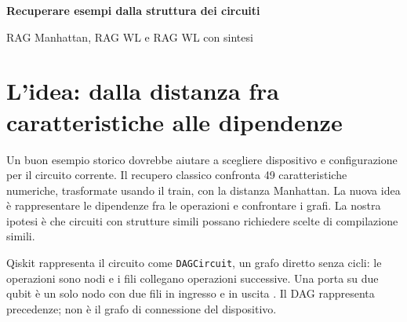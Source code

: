 \documentclass[a4paper,10pt]{article}
\begin{document}
{\LARGE\bfseries Recuperare esempi dalla struttura dei circuiti}\par
{\Large RAG Manhattan, RAG WL e RAG WL con sintesi}\par\medskip
\section{L'idea: dalla distanza fra caratteristiche alle dipendenze}
Un buon esempio storico dovrebbe aiutare a scegliere dispositivo e configurazione
per il circuito corrente. Il recupero classico confronta 49 caratteristiche numeriche,
trasformate usando il train, con la distanza Manhattan.
La nuova idea è rappresentare le dipendenze fra le operazioni e confrontare i grafi.
La nostra ipotesi è che circuiti con strutture simili possano richiedere scelte di
compilazione simili.

Qiskit rappresenta il circuito come \texttt{DAGCircuit}, un grafo diretto senza
cicli: le operazioni sono nodi e i fili collegano operazioni successive.
Una porta su due qubit è un solo nodo con due fili in ingresso e in uscita
\cite{qiskit}. Il DAG rappresenta precedenze; non è il grafo di connessione del dispositivo.
\end{document}
